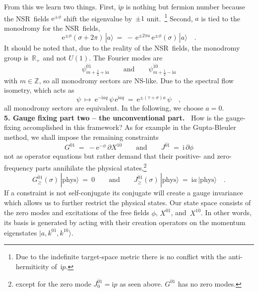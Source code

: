 \documentclass[a4paper,11pt]{article}
\def\s{\sigma}
\def\t{\tau}
\def\j{\psi}
\newcommand{\R}{\mathbb R}
\newcommand{\Z}{\mathbb Z}
\def\e{\textrm{e}}
\def\i{\textrm{i}}
\def\pa{\mbox{$\partial$}}
\def\zd{{\dot{0}}}
\def\od{{\dot{1}}}
\def\zdd{{\ddot{0}}}
\def\odd{{\ddot{1}}}
\begin{document}
{}From this we learn two things.
First, $\i p$ is nothing but fermion number because
the NSR~fields $\e^{\pm\phi}$ shift the eigenvalue by~$\pm1$ unit.~\footnote{
Due to the indefinite target-space metric there is no conflict with the
anti-hermiticity of~$\i p$.}
Second, $a$ is tied to the monodromy for the NSR~fields,
\begin{equation}
\e^{\pm\phi}(\s{+}2\pi)\,|a\rangle\ =\ 
-\,\e^{\pm 2\pi a}\,\e^{\pm\phi}(\s)\,|a\rangle \quad.
\end{equation}
It should be noted that, due to the reality of the NSR~fields, the monodromy
group is~$\R_+$ and not $U(1)$. The Fourier modes are
\begin{equation}
\j^{\zdd\od}_{m+\frac12+\i a}
\qquad\textrm{and}\qquad
\j^{\odd\zd}_{m+\frac12-\i a}
\end{equation}
with $m\in\Z$, so all monodromy sectors are NS-like. 
Due to the spectral flow isometry, which acts as
\begin{equation}
\j\ \longmapsto\ \e^{-\i a q}\,\j\,\e^{\i a q}\ =\ \e^{\pm(\t+\s)a}\,\j \quad,
\end{equation}
all monodromy sectors are equivalent. In the following, we choose $a{=}0$.
\\


\bigskip\noindent
{\bf 5. Gauge fixing part two -- the unconventional part.\ }
How is the gauge-fixing accomplished in this framework?
As for example in the Gupta-Bleuler method, we shall impose the remaining
constraints 
\begin{equation}
G^{\zdd 1}\ =\ -\e^{-\phi}\,\pa X^{1\zd}
\qquad\textrm{and}\qquad
J^{\zdd\odd}\ =\ \i\,\pa\phi 
\end{equation}
not as operator equations but rather demand that their 
positive- and zero-frequency parts annihilate the physical states,\footnote{
except for the zero mode $J_0^{\zdd\odd}=\i p$ as seen above.
$G^{\zdd 1}$ has no zero modes.}
\begin{equation}
G_\ge^{\zdd 1}(\s)\,|\textrm{phys}\rangle\ =\ 0
\qquad\textrm{and}\qquad
J_\ge^{\zdd\odd}(\s)\,|\textrm{phys}\rangle\ =\ \i a\,|\textrm{phys}\rangle 
\quad.
\end{equation}
If a constraint is not self-conjugate its conjugate will create a gauge 
invariance which allows us to further restrict the physical states.
Our state space consists of the zero modes and excitations of the free fields
$\phi$, $X^{0\od}$, and~$X^{1\zd}$. In other words, its basis is generated
by acting with their creation operators on the momentum eigenstates
$|a,k^{0\od},k^{1\zd}\rangle$. 
\end{document}
